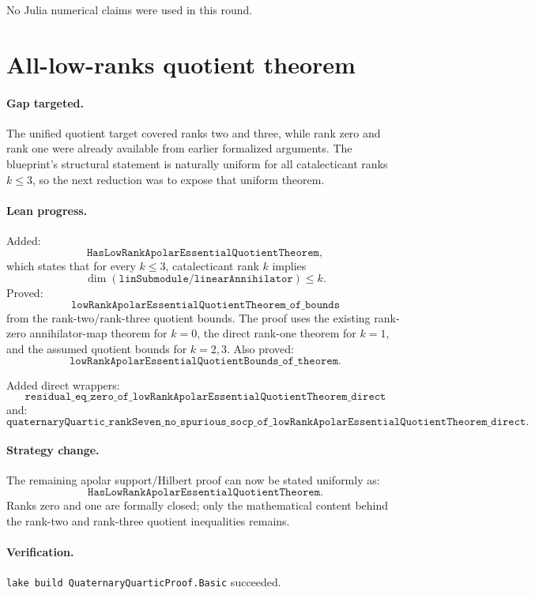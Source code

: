 \documentclass[11pt]{article}
\begin{document}
No Julia numerical claims were used in this round.

\section*{All-low-ranks quotient theorem}

\paragraph{Gap targeted.}
The unified quotient target covered ranks two and three, while rank zero and
rank one were already available from earlier formalized arguments.  The
blueprint's structural statement is naturally uniform for all catalecticant
ranks \(k\le3\), so the next reduction was to expose that uniform theorem.

\paragraph{Lean progress.}
Added:
\[
\texttt{HasLowRankApolarEssentialQuotientTheorem},
\]
which states that for every \(k\le3\), catalecticant rank \(k\) implies
\[
\dim(\texttt{linSubmodule}/\texttt{linearAnnihilator})\le k.
\]
Proved:
\[
\texttt{lowRankApolarEssentialQuotientTheorem\_of\_bounds}
\]
from the rank-two/rank-three quotient bounds.  The proof uses the existing
rank-zero annihilator-map theorem for \(k=0\), the direct rank-one theorem for
\(k=1\), and the assumed quotient bounds for \(k=2,3\).  Also proved:
\[
\texttt{lowRankApolarEssentialQuotientBounds\_of\_theorem}.
\]

Added direct wrappers:
\[
\texttt{residual\_eq\_zero\_of\_lowRankApolarEssentialQuotientTheorem\_direct}
\]
and:
\[
\texttt{quaternaryQuartic\_rankSeven\_no\_spurious\_socp\_of\_lowRankApolarEssentialQuotientTheorem\_direct}.
\]

\paragraph{Strategy change.}
The remaining apolar support/Hilbert proof can now be stated uniformly as:
\[
\texttt{HasLowRankApolarEssentialQuotientTheorem}.
\]
Ranks zero and one are formally closed; only the mathematical content behind
the rank-two and rank-three quotient inequalities remains.

\paragraph{Verification.}
\texttt{lake build QuaternaryQuarticProof.Basic} succeeded.
\end{document}
